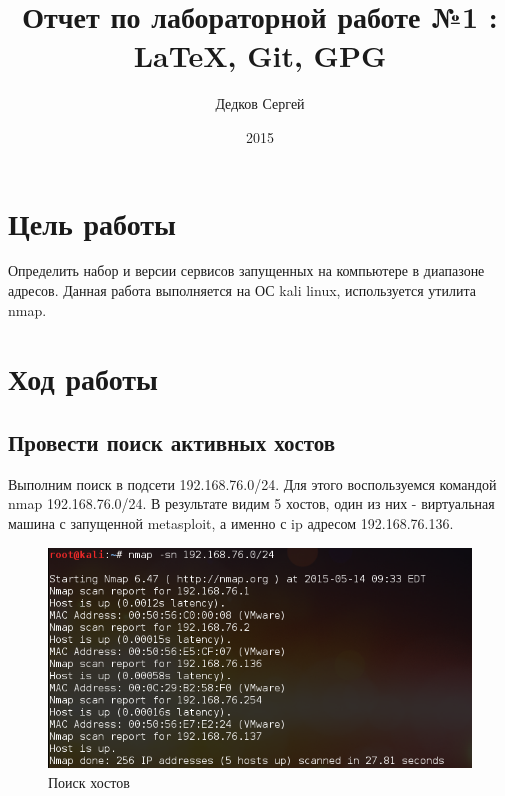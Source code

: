 \documentclass[11pt, a4paper]{article}		%
\author{Дедков Сергей}
\title{Отчет по лабораторной работе №1 :\\ \LaTeX{}, Git, GPG}
\date{2015}
\begin{document}
\maketitle
\tableofcontents
\newpage



\section{Цель работы}

Определить набор и версии сервисов запущенных на компьютере в диапазоне адресов.
Данная работа выполняется на ОС kali linux, используется утилита nmap.




\section{Ход работы}



\subsection{Провести поиск активных хостов}

Выполним поиск в подсети 192.168.76.0/24. Для этого воспользуемся командой nmap 192.168.76.0/24.
В результате видим 5 хостов, один из них - виртуальная машина с запущенной metasploit, а именно с ip адресом 192.168.76.136.

\begin{figure}[h!]
\centering
\includegraphics[scale=0.68]{res/hosts_search}
\caption{Поиск хостов}
\end{figure}
\end{document}
